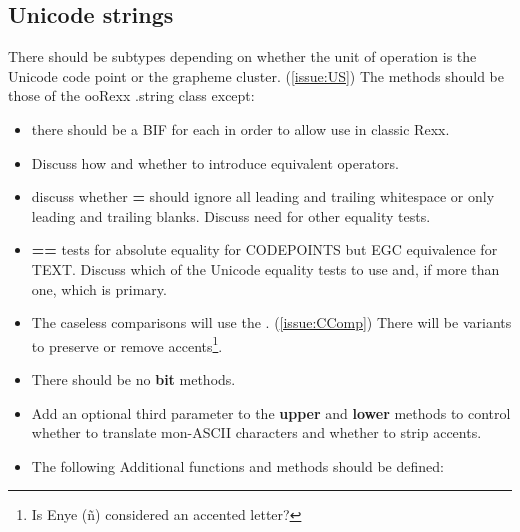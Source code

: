 \documentclass[b4paper]{article}
\begin{document}
\subsection{Unicode strings}

There should be subtypes depending on whether the
unit of operation is the Unicode code point or the grapheme cluster. (\cref{issue:US})
The methods should be those of the ooRexx .string class except:
\begin{itemize}
\item there should be a BIF for each in order to allow use in classic Rexx.
\item Discuss how and whether to introduce equivalent operators.
\item discuss whether \textbf{=} should ignore all leading and trailing whitespace
or only leading and trailing blanks. Discuss need for other equality tests.
\item \textbf{==} tests for absolute equality for CODEPOINTS but
EGC equivalence for TEXT.
Discuss which of the Unicode equality tests to use and,
if more than one, which is primary.
\item
The caseless comparisons will use the \cite{UCD}.
(\cref{issue:CComp})
There will be variants to preserve or remove accents\footnote{Is Enye (\~n) considered an accented letter?}.
\item There should be no \textbf{bit\textellipsis} methods.
\item Add an optional third parameter to the \textbf{upper} and \textbf{lower} methods
to control whether to translate mon-ASCII characters and whether to strip accents.
\item
The following Additional functions and methods should be defined:
\end{itemize}
\end{document}
